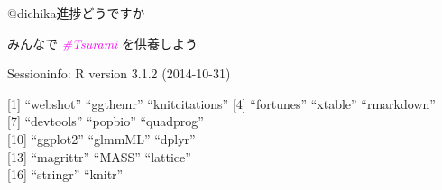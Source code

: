 \documentclass[ignorenonframetext,]{beamer}
\begin{document}
\begin{frame}{@dichika進捗どうですか\faEyeOpen}


\end{frame}

\begin{frame}{\Large{みんなで \textit{\textcolor{magenta}{\#Tsurami}} を供養しよう}}


\end{frame}

\begin{frame}{\small{Sessioninfo: R version 3.1.2 (2014-10-31)}}

{[}1{]} ``webshot'' ``ggthemr'' ``knitcitations'' {[}4{]} ``fortunes''
``xtable'' ``rmarkdown''\\ {[}7{]} ``devtools'' ``popbio''
``quadprog''\\{[}10{]} ``ggplot2'' ``glmmML'' ``dplyr''\\{[}13{]}
``magrittr'' ``MASS'' ``lattice''\\{[}16{]} ``stringr'' ``knitr''


\end{frame}
\end{document}
